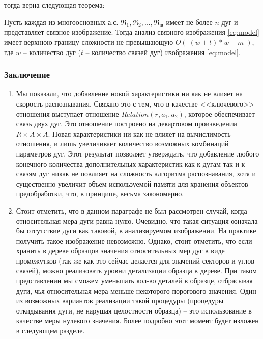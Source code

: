 \noindent
тогда верна следующая теорема:
\begin{theorem}
Пусть каждая из многоосновных а.с. $\mathfrak{R_1, R_2, ..., R_m}$ имеет не  более $n$ дуг и представляет связное изображение. Тогда анализ  связного изображения \ref{eq:model} имеет верхнюю границу сложности не превышающую $O(\;(w + t)*w + m\;)$, где  $w$ -- количество дуг ($t$ -- количество связей дуг) изображения \ref{eq:model}.
\end{theorem}

\subsubsection{Заключение}

\begin{enumerate}
\item Мы показали, что добавление новой характеристики ни как не влияет на скорость распознавания. Связано это с тем, что в качестве <<ключевого>> отношения выступает отношение $Relation(r,a_1, a_2)$, которое обеспечивает связь двух дуг. Это отношение построено на декартовом произведении $R \times A \times A$. Новая характеристики ни как не влияет на вычислимость отношения, и лишь увеличивает количество возможных комбинаций параметров дуг.
Этот результат позволяет утверждать, что добавление любого конечного количества дополнительных характеристик как к дугам так и к связям дуг никак не повлияет на сложность алгоритма распознавания, хотя и существенно увеличит объем используемой памяти для хранения объектов предобработки, что, в принципе, весьма закономерно.
\item Стоит отметить, что в данном параграфе не был рассмотрен случай, когда относительная мера дуги равна нулю. Очевидно, что такая ситуация означала бы отсутствие дуги как таковой, в анализируемом изображении. На практике получить такое изображение невозможно. Однако, стоит отметить, что если хранить в дереве образцов значения относительных мер дуг в виде промежутков (так же как это сейчас делается для значений секторов и углов связей), можно реализовать уровни детализации образца в дереве. При таком представлении мы сможем уменьшать кол-во деталей в образце, отбрасывая дуги, чья относительная мера меньше некоторого порогового значения. Один из возможных вариантов реализации такой процедуры (процедуры откидывания дуги, не нарушая целостности образца) -- это использование в качестве меры нулевого значения. Более подробно этот момент будет изложен в следующем разделе.
\end{enumerate}


